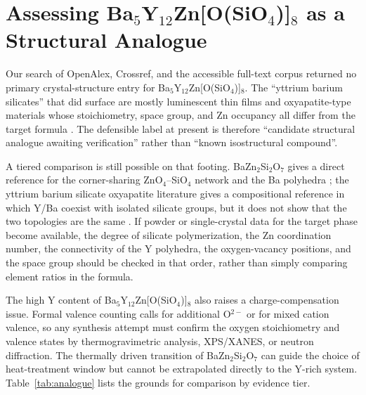 \section{Assessing Ba$_5$Y$_{12}$Zn[O(SiO$_4$)]$_8$ as a Structural Analogue}

Our search of OpenAlex, Crossref, and the accessible full-text corpus returned no primary crystal-structure entry for Ba$_5$Y$_{12}$Zn[O(SiO$_4$)]$_8$. The ``yttrium barium silicates'' that did surface are mostly luminescent thin films and oxyapatite-type materials whose stoichiometry, space group, and Zn occupancy all differ from the target formula \cite{gupta2021combustion,yang2021cyan}. The defensible label at present is therefore ``candidate structural analogue awaiting verification'' rather than ``known isostructural compound''.

A tiered comparison is still possible on that footing. BaZn$_2$Si$_2$O$_7$ gives a direct reference for the corner-sharing ZnO$_4$--SiO$_4$ network and the Ba polyhedra \cite{lin1999phase,available2020materials,kaiser2002crystal}; the yttrium barium silicate oxyapatite literature gives a compositional reference in which Y\slash Ba coexist with isolated silicate groups, but it does not show that the two topologies are the same \cite{gupta2021combustion,yang2021cyan,wei2013a}. If powder or single-crystal data for the target phase become available, the degree of silicate polymerization, the Zn coordination number, the connectivity of the Y polyhedra, the oxygen-vacancy positions, and the space group should be checked in that order, rather than simply comparing element ratios in the formula.

The high Y content of Ba$_5$Y$_{12}$Zn[O(SiO$_4$)]$_8$ also raises a charge-compensation issue. Formal valence counting calls for additional O$^{2-}$ or for mixed cation valence, so any synthesis attempt must confirm the oxygen stoichiometry and valence states by thermogravimetric analysis, XPS\slash XANES, or neutron diffraction. The thermally driven transition of BaZn$_2$Si$_2$O$_7$ can guide the choice of heat-treatment window but cannot be extrapolated directly to the Y-rich system. Table~\ref{tab:analogue} lists the grounds for comparison by evidence tier.

